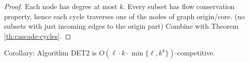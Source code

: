 \documentclass[]{article}
\begin{document}
\begin{proof}
	Each node has degree at most $k$.
	Every subset has flow conservation property, hence each cycle traverses one of the nodes of graph origin/core. (no subsets with just incoming edges to the origin part)
	Combine with Theorem \ref{th:cascade-cycles}.
	
\end{proof}


Corollary: Algorithm DET2 is $O(\ell \cdot k \cdot \min \{ \ell, k^k \})$-competitive.

  
  


\appendix
\end{document}
